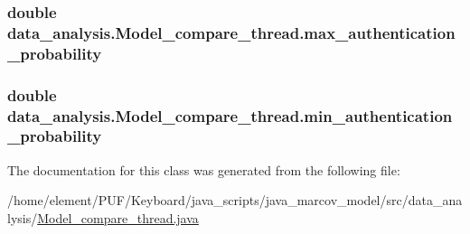\subsubsection[{\texorpdfstring{max\+\_\+authentication\+\_\+probability}{max_authentication_probability}}]{\setlength{\rightskip}{0pt plus 5cm}double data\+\_\+analysis.\+Model\+\_\+compare\+\_\+thread.\+max\+\_\+authentication\+\_\+probability}\hypertarget{classdata__analysis_1_1_model__compare__thread_a6213d96c54d70f9e8a2d01010414ecd3}{}\label{classdata__analysis_1_1_model__compare__thread_a6213d96c54d70f9e8a2d01010414ecd3}
\subsubsection[{\texorpdfstring{min\+\_\+authentication\+\_\+probability}{min_authentication_probability}}]{\setlength{\rightskip}{0pt plus 5cm}double data\+\_\+analysis.\+Model\+\_\+compare\+\_\+thread.\+min\+\_\+authentication\+\_\+probability}\hypertarget{classdata__analysis_1_1_model__compare__thread_a8a9c58abe260de662f846876d4f7fed2}{}\label{classdata__analysis_1_1_model__compare__thread_a8a9c58abe260de662f846876d4f7fed2}


The documentation for this class was generated from the following file\+:\begin{DoxyCompactItemize}
\item 
/home/element/\+P\+U\+F/\+Keyboard/java\+\_\+scripts/java\+\_\+marcov\+\_\+model/src/data\+\_\+analysis/\hyperlink{_model__compare__thread_8java}{Model\+\_\+compare\+\_\+thread.\+java}\end{DoxyCompactItemize}
